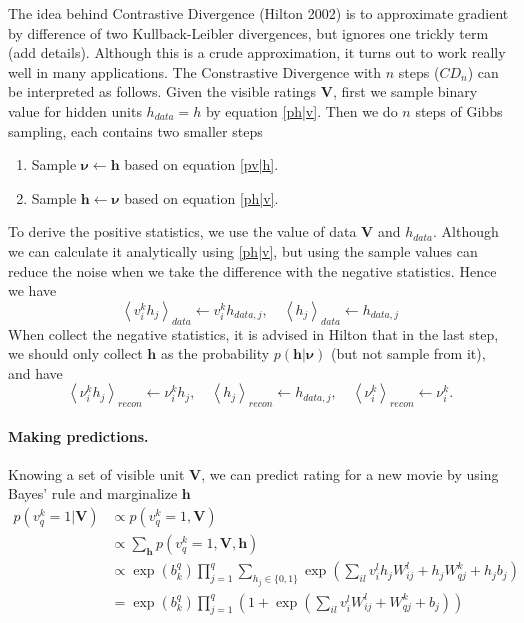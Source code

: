 \documentclass[bj, preprint]{imsart}
\newcommand{\cexp}[1]{\left<#1\right>}
\begin{document}
The idea behind Contrastive Divergence (Hilton 2002) is to approximate gradient by difference of two Kullback-Leibler divergences, but ignores one trickly term (add details). Although this is a crude approximation, it turns out to work really well in many applications. The Constrastive Divergence with $n$ steps ($CD_n$) can be interpreted as follows. Given the visible ratings $\textbf{V}$, first we sample binary value for hidden units $h_{data} = h$ by equation \eqref{ph|v}. Then we do $n$ steps of Gibbs sampling, each contains two smaller steps
\begin{enumerate}
	\item Sample $\boldsymbol{\nu} \leftarrow \boldsymbol{h}$ based on equation \eqref{pv|h}.
	\item Sample $\boldsymbol{h} \leftarrow \boldsymbol{\nu}$ based on equation \eqref{ph|v}.
\end{enumerate}
To derive the positive statistics, we use the value of data $\textbf{V}$ and $h_{data}$. Although we can calculate it analytically using \eqref{ph|v}, but using the sample values can reduce the noise when we take the difference with the negative statistics. Hence we have
$$\cexp{v_i^k h_j}_{data} \leftarrow v_i^k h_{data, j}, \quad \cexp{h_j}_{data} \leftarrow h_{data, j}$$
When collect the negative statistics, it is advised in Hilton that in the last step, we should only collect $\boldsymbol{h}$ as the probability $p(\textbf{h}|\boldsymbol{\nu})$ (but not sample from it), and have     
$$\cexp{\nu_i^k h_j}_{recon} \leftarrow \nu_i^k h_{j},\quad \cexp{h_j}_{recon} \leftarrow h_{data, j},\quad \cexp{\nu_i^k}_{recon} \leftarrow \nu_i^k.$$

\paragraph{Making predictions.}\label{par:method.models.rbm.pred}

Knowing a set of visible unit $\textbf{V}$, we can predict rating for a new movie by using Bayes' rule and marginalize $\textbf{h}$
\begin{align*}
p(v_q^{k} =  1 |\textbf{V}) & \propto p(v_q^{k} = 1, \textbf{V})  \\
&  \propto \sum_{\textbf{h}} p(v_q^{k} = 1, \textbf{V}, \textbf{h})\\
& \propto \exp(b_k^q) \prod_{j=1}^{q} \sum_{h_j\in \{0,1\}} \exp(\sum_{il} v_i^{l} h_j W_{ij}^{l} + h_j W_{qj}^{k} + h_jb_j)\\
& = \exp(b_k^q) \prod_{j=1}^{q} \left( 1 +  \exp(\sum_{il} v_i^{l} W_{ij}^{l} +  W_{qj}^{k} + b_j)\right)
\end{align*}
\end{document}
